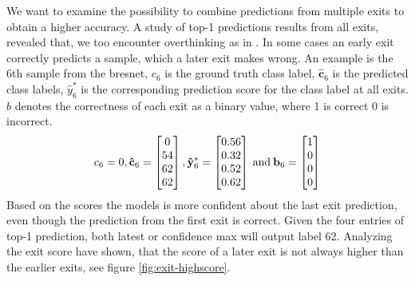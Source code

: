 We want to examine the possibility to combine predictions from multiple exits to obtain a higher accuracy. A study of top-1 predictions results from all exits, revealed that, we too encounter overthinking as in \cite{kaya_shallow-deep_nodate}. In some cases an early exit correctly predicts a sample, which a later exit makes wrong. An example is the 6th sample from the \gls{bresnet}, $ c_6 $ is the ground truth class label, $ \bm{\hat{c}}_6 $ is the predicted class labels, $ \hat{y}^*_6 $ is the corresponding prediction score for the class label at all exits. $ b $ denotes the correctness of each exit as a binary value, where 1 is correct 0 is incorrect.
\begin{align*}
c_6=0,
\mathbf{\hat{c}}_{6}=
\begin{bmatrix}
0 \\
54 \\
62 \\
62
\end{bmatrix},
\mathbf{\hat{y}}^{*}_{6}=
\begin{bmatrix}
0.56 \\
0.32 \\
0.52 \\
0.62
\end{bmatrix} \text{\:and\:}
\mathbf{b}_{6}=
\begin{bmatrix}
1 \\
0 \\
0 \\
0
\end{bmatrix}
\end{align*}
Based on the scores the models is more confident about the last exit prediction, even though the prediction from the first exit is correct. Given the four entries of top-1 prediction, both latest or confidence max will output label 62. Analyzing the exit score have shown, that the score of a later exit is not always higher than the earlier exits, see figure \ref{fig:exit-highscore}.

